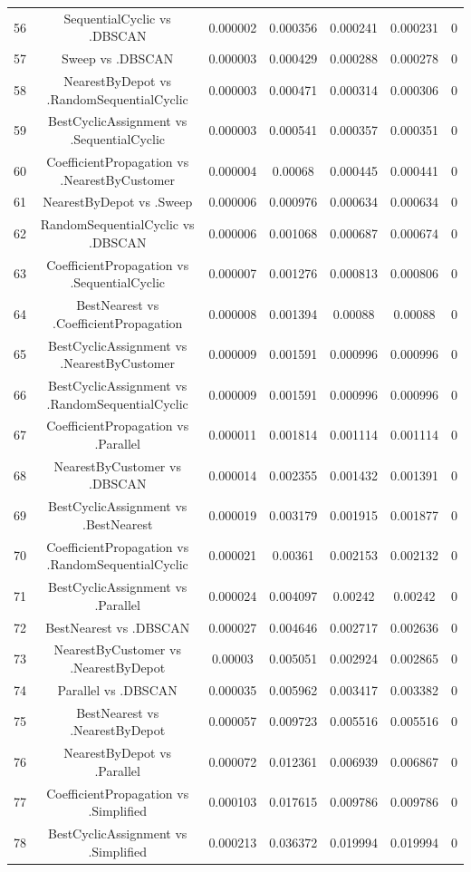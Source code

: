 \documentclass[a4paper,10pt]{article}
\begin{document}
\begin{landscape}
\begin{table}[!htp]
\begin{tabular}{ccccccc}
56&SequentialCyclic vs .DBSCAN&0.000002&0.000356&0.000241&0.000231&0\\
57&Sweep vs .DBSCAN&0.000003&0.000429&0.000288&0.000278&0\\
58&NearestByDepot vs .RandomSequentialCyclic&0.000003&0.000471&0.000314&0.000306&0\\
59&BestCyclicAssignment vs .SequentialCyclic&0.000003&0.000541&0.000357&0.000351&0\\
60&CoefficientPropagation vs .NearestByCustomer&0.000004&0.00068&0.000445&0.000441&0\\
61&NearestByDepot vs .Sweep&0.000006&0.000976&0.000634&0.000634&0\\
62&RandomSequentialCyclic vs .DBSCAN&0.000006&0.001068&0.000687&0.000674&0\\
63&CoefficientPropagation vs .SequentialCyclic&0.000007&0.001276&0.000813&0.000806&0\\
64&BestNearest vs .CoefficientPropagation&0.000008&0.001394&0.00088&0.00088&0\\
65&BestCyclicAssignment vs .NearestByCustomer&0.000009&0.001591&0.000996&0.000996&0\\
66&BestCyclicAssignment vs .RandomSequentialCyclic&0.000009&0.001591&0.000996&0.000996&0\\
67&CoefficientPropagation vs .Parallel&0.000011&0.001814&0.001114&0.001114&0\\
68&NearestByCustomer vs .DBSCAN&0.000014&0.002355&0.001432&0.001391&0\\
69&BestCyclicAssignment vs .BestNearest&0.000019&0.003179&0.001915&0.001877&0\\
70&CoefficientPropagation vs .RandomSequentialCyclic&0.000021&0.00361&0.002153&0.002132&0\\
71&BestCyclicAssignment vs .Parallel&0.000024&0.004097&0.00242&0.00242&0\\
72&BestNearest vs .DBSCAN&0.000027&0.004646&0.002717&0.002636&0\\
73&NearestByCustomer vs .NearestByDepot&0.00003&0.005051&0.002924&0.002865&0\\
74&Parallel vs .DBSCAN&0.000035&0.005962&0.003417&0.003382&0\\
75&BestNearest vs .NearestByDepot&0.000057&0.009723&0.005516&0.005516&0\\
76&NearestByDepot vs .Parallel&0.000072&0.012361&0.006939&0.006867&0\\
77&CoefficientPropagation vs .Simplified&0.000103&0.017615&0.009786&0.009786&0\\
78&BestCyclicAssignment vs .Simplified&0.000213&0.036372&0.019994&0.019994&0\\

\end{tabular}
\end{table}
\end{landscape}
\end{document}
